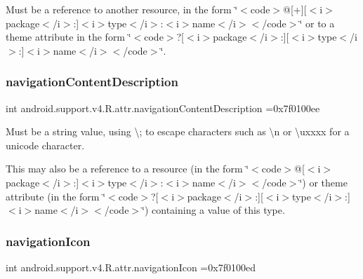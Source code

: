 Must be a reference to another resource, in the form \char`\"{}$<$code$>$@\mbox{[}+\mbox{]}\mbox{[}$<$i$>$package$<$/i$>$\+:\mbox{]}$<$i$>$type$<$/i$>$\+:$<$i$>$name$<$/i$>$$<$/code$>$\char`\"{} or to a theme attribute in the form \char`\"{}$<$code$>$?\mbox{[}$<$i$>$package$<$/i$>$\+:\mbox{]}\mbox{[}$<$i$>$type$<$/i$>$\+:\mbox{]}$<$i$>$name$<$/i$>$$<$/code$>$\char`\"{}. \mbox{\label{classandroid_1_1support_1_1v4_1_1R_1_1attr_ae8b1add32bd7b6f2205c9f7569130ffa}} 
\subsubsection{\texorpdfstring{navigation\+Content\+Description}{navigationContentDescription}}
{\footnotesize\ttfamily int android.\+support.\+v4.\+R.\+attr.\+navigation\+Content\+Description =0x7f0100ee\hspace{0.3cm}{\ttfamily [static]}}

Must be a string value, using \textquotesingle{}\textbackslash{};\textquotesingle{} to escape characters such as \textquotesingle{}\textbackslash{}n\textquotesingle{} or \textquotesingle{}\textbackslash{}uxxxx\textquotesingle{} for a unicode character. 

This may also be a reference to a resource (in the form \char`\"{}$<$code$>$@\mbox{[}$<$i$>$package$<$/i$>$\+:\mbox{]}$<$i$>$type$<$/i$>$\+:$<$i$>$name$<$/i$>$$<$/code$>$\char`\"{}) or theme attribute (in the form \char`\"{}$<$code$>$?\mbox{[}$<$i$>$package$<$/i$>$\+:\mbox{]}\mbox{[}$<$i$>$type$<$/i$>$\+:\mbox{]}$<$i$>$name$<$/i$>$$<$/code$>$\char`\"{}) containing a value of this type. \mbox{\label{classandroid_1_1support_1_1v4_1_1R_1_1attr_a2393d3f1cec603657e15756cff171b98}} 
\subsubsection{\texorpdfstring{navigation\+Icon}{navigationIcon}}
{\footnotesize\ttfamily int android.\+support.\+v4.\+R.\+attr.\+navigation\+Icon =0x7f0100ed\hspace{0.3cm}{\ttfamily [static]}}

